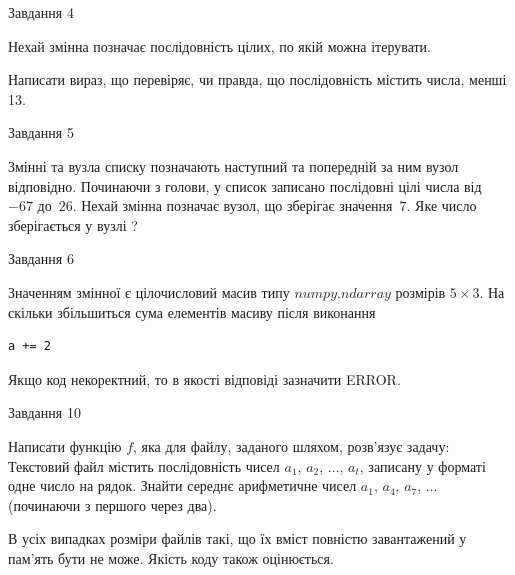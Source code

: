 \documentclass[12pt, ukrainian]{article}
\begin{document}
{               
{\begin{center}Завдання {4}\end{center}}
\vspace{-6mm}
Нехай змінна  позначає послідовність цілих, по якій можна ітерувати.

Написати вираз, що перевіряє, чи правда, що послідовність  містить числа, менші 13.\par

\vspace{10mm}
               
{\begin{center}Завдання {5}\end{center}}
\vspace{-6mm}
Змінні  та  вузла списку позначають наступний та попередній за ним вузол відповідно. Починаючи з голови, у список записано послідовні цілі числа від~$-67$ до~$26$. Нехай змінна  позначає вузол, що зберігає значення~$7$.
Яке число зберігається у вузлі  ?\par

               
{\begin{center}Завдання {6}\end{center}}
\vspace{-6mm}
Значенням змінної  є цілочисловий масив типу $numpy.ndarray$ розмірів $5{\times}3$. На скільки збільшиться сума елементів масиву  після виконання
\begin{verbatim}
a += 2
\end{verbatim}


Якщо код некоректний, то в якості відповіді зазначити ERROR.\par

               
{\begin{center}Завдання {10}\end{center}}
\vspace{-6mm}

Написати функцію $f$, яка для файлу, заданого шляхом, розв’язує задачу:\\ Текстовий файл містить послідовність чисел $a_1$, $a_2$, $\ldots$, $a_t$, записану у форматі одне число на рядок. Знайти середнє арифметичне чисел $a_1$, $a_4$, $a_7$, $\ldots$ (починаючи з першого через два).

В усіх випадках розміри файлів такі, що їх вміст повністю завантажений у пам'ять бути не може. Якість коду також оцінюється.



}
\end{document}
